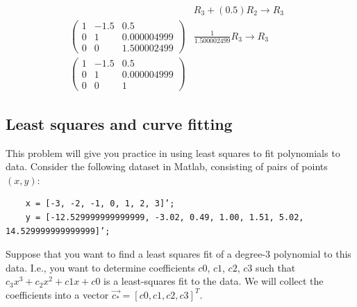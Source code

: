 \documentclass{article}
\begin{document}
\begin{itemize}
\begin{align*}
        & R_3 + (0.5)R_2\rightarrow R_3 & \\
        \begin{pmatrix} 1 & -1.5 & 0.5 \\ 0 & 1 & 0.000004999 \\ 0 & 0 & 1.500002499 \end{pmatrix}
        & \frac{1}{1.500002499}R_3\rightarrow R_3 \\
        \begin{pmatrix} 1 & -1.5 & 0.5 \\ 0 & 1 & 0.000004999 \\ 0 & 0 & 1 \end{pmatrix}
    \end{align*}
\end{itemize}

\newpage
\subsection{Least squares and curve fitting}
This problem will give you practice in using least squares to fit polynomials to data. Consider the following dataset in Matlab, consisting of pairs of points $(x, y)$:
\begin{verbatim}
    x = [-3, -2, -1, 0, 1, 2, 3]’;
    y = [-12.529999999999999, -3.02, 0.49, 1.00, 1.51, 5.02, 14.529999999999999]’;
\end{verbatim}
Suppose that you want to find a least squares fit of a degree-3 polynomial to this data. I.e., you want to determine coefficients $c0$, $c1$, $c2$, $c3$ such that $c_3x^3 + c_2x^2 + c1x + c0$ is a least-squares fit to the data. We will collect the coefficients into a vector $\overrightarrow{c_*} = [c0, c1, c2, c3]^T$.
\end{document}
